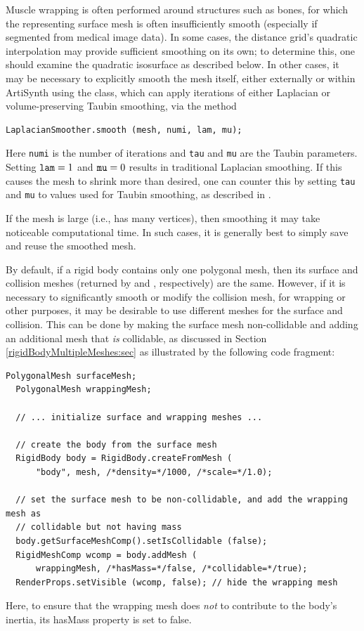Muscle wrapping is often performed around structures such as bones,
for which the representing surface mesh is often insufficiently smooth
(especially if segmented from medical image data).  In some cases, the
distance grid's quadratic interpolation may provide sufficient
smoothing on its own; to determine this, one should examine the
quadratic isosurface as described below. In other cases, it may be
necessary to explicitly smooth the mesh itself, either externally or
within ArtiSynth using the  class,
which can apply iterations of either Laplacian or volume-preserving
Taubin smoothing, via the method
%
\begin{lstlisting}[]
  LaplacianSmoother.smooth (mesh, numi, lam, mu);
\end{lstlisting}
%
Here {\tt numi} is the number of iterations and {\tt tau} and {\tt mu}
are the Taubin parameters. Setting ${\tt lam} = 1$ and ${\tt mu} = 0$
results in traditional Laplacian smoothing. If this causes the mesh to
shrink more than desired, one can counter this by setting {\tt tau}
and {\tt mu} to values used for Taubin smoothing, as described in
\cite{taubin1995curve}.

\begin{sideblock}
If the mesh is large (i.e., has many vertices), then smoothing it may
take noticeable computational time. In such cases, it is generally best
to simply save and reuse the smoothed mesh.
\end{sideblock}

By default, if a rigid body contains only one polygonal mesh, then its
surface and collision meshes (returned by
 and
, respectively) are
the same.  However, if it is necessary to significantly smooth or
modify the collision mesh, for wrapping or other purposes, it may be
desirable to use different meshes for the surface and collision. This
can be done by making the surface mesh non-collidable and adding an
additional mesh that {\it is} collidable, as discussed in Section
\ref{rigidBodyMultipleMeshes:sec} as illustrated by the following code
fragment:
%
\begin{lstlisting}[]
  PolygonalMesh surfaceMesh;
  PolygonalMesh wrappingMesh;

  // ... initialize surface and wrapping meshes ...

  // create the body from the surface mesh
  RigidBody body = RigidBody.createFromMesh (
      "body", mesh, /*density=*/1000, /*scale=*/1.0);

  // set the surface mesh to be non-collidable, and add the wrapping mesh as
  // collidable but not having mass
  body.getSurfaceMeshComp().setIsCollidable (false);
  RigidMeshComp wcomp = body.addMesh (
      wrappingMesh, /*hasMass=*/false, /*collidable=*/true);
  RenderProps.setVisible (wcomp, false); // hide the wrapping mesh
\end{lstlisting}
%
Here, to ensure that the wrapping mesh does {\it not} to contribute to
the body's inertia, its {\sf hasMass} property is set to false.

